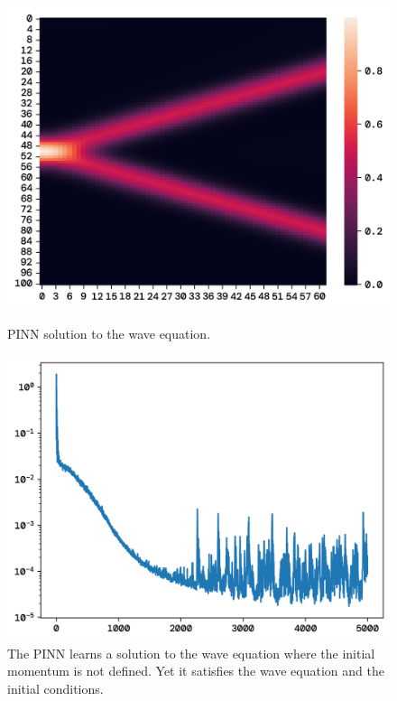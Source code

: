 \documentclass[twoside,11pt]{report}
\begin{document}
    \begin{figure}[!ht]
        \begin{minipage}[t]{0.5\textwidth - 1mm}
            \begin{center}
                \includegraphics[width=\textwidth]{../runsAndFigures/wave_tf_hybrid.png}
            \end{center}
            \caption
            {
                PINN solution to the wave equation.
            }\label{fig:wave_own_dnn}
        \end{minipage}
        \hspace{2mm}
        \begin{minipage}[t]{0.5\textwidth - 1mm}
            \begin{center}
                \includegraphics[width=\textwidth]{../runsAndFigures/wave_tf_hybrid_loss.png}
            \end{center}
            \caption
            {
                The PINN learns a solution to the wave equation where the initial momentum is not defined.
                Yet it satisfies the wave equation and the initial conditions.
            }\label{fig:wave_tf_dnn}
        \end{minipage}
    \end{figure}
\end{document}
